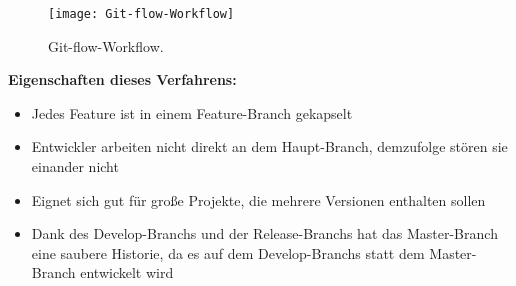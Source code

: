 \begin{figure}[H]
	\centering
	\texttt{[image: Git-flow-Workflow]}
	\caption[Git-flow-Workflow]{Git-flow-Workflow.\\ \cite{Git-flow-Workflow}}
	\label{fig:Git-flow-Workflow}
\end{figure}
	
\textbf{Eigenschaften dieses Verfahrens:}
\begin{itemize}
	\item Jedes Feature ist in einem Feature-Branch gekapselt
	\item Entwickler arbeiten nicht direkt an dem Haupt-Branch, demzufolge stören sie einander nicht
	\item Eignet sich gut für große Projekte, die mehrere Versionen enthalten sollen
	\item Dank des Develop-Branchs und der Release-Branchs hat das Master-Branch eine saubere Historie, da es auf dem Develop-Branchs statt dem Master-Branch entwickelt wird
\end{itemize}

